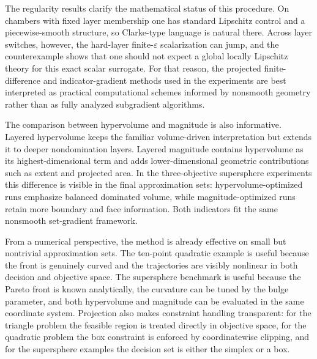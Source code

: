 \documentclass{article}
\begin{document}
The regularity results clarify the mathematical status of this procedure.  On chambers with fixed layer membership one has standard Lipschitz control and a piecewise-smooth structure, so Clarke-type language is natural there.  Across layer switches, however, the hard-layer finite-$\varepsilon$ scalarization can jump, and the counterexample shows that one should not expect a global locally Lipschitz theory for this exact scalar surrogate.  For that reason, the projected finite-difference and indicator-gradient methods used in the experiments are best interpreted as practical computational schemes informed by nonsmooth geometry rather than as fully analyzed subgradient algorithms.

The comparison between hypervolume and magnitude is also informative.  Layered hypervolume keeps the familiar volume-driven interpretation but extends it to deeper nondomination layers.  Layered magnitude contains hypervolume as its highest-dimensional term and adds lower-dimensional geometric contributions such as extent and projected area.  In the three-objective supersphere experiments this difference is visible in the final approximation sets: hypervolume-optimized runs emphasize balanced dominated volume, while magnitude-optimized runs retain more boundary and face information.  Both indicators fit the same nonsmooth set-gradient framework.

From a numerical perspective, the method is already effective on small but nontrivial approximation sets.  The ten-point quadratic example is useful because the front is genuinely curved and the trajectories are visibly nonlinear in both decision and objective space.  The supersphere benchmark is useful because the Pareto front is known analytically, the curvature can be tuned by the bulge parameter, and both hypervolume and magnitude can be evaluated in the same coordinate system.  Projection also makes constraint handling transparent: for the triangle problem the feasible region is treated directly in objective space, for the quadratic problem the box constraint is enforced by coordinatewise clipping, and for the supersphere examples the decision set is either the simplex or a box.
\end{document}
